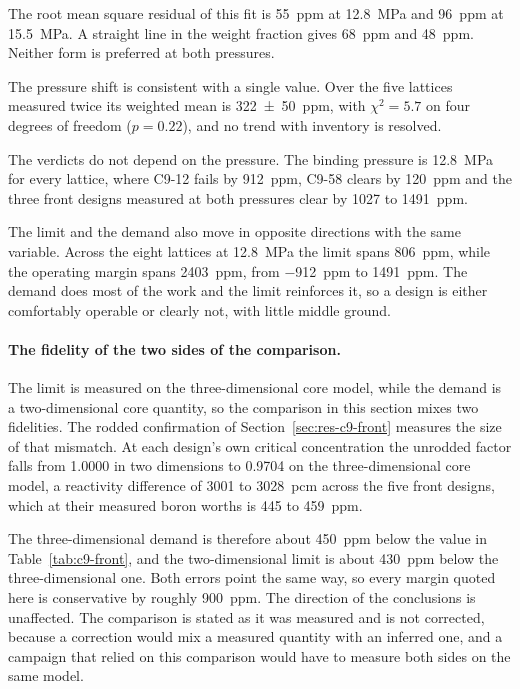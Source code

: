 The root mean square residual of this fit is \SI{55}{ppm} at
\SI{12.8}{MPa} and \SI{96}{ppm} at \SI{15.5}{MPa}. A straight line in
the weight fraction gives \SI{68}{ppm} and \SI{48}{ppm}. Neither form is
preferred at both pressures.

The pressure shift is consistent with a single value. Over the five
lattices measured twice its weighted mean is \SI{322(50)}{ppm}, with
$\chi^2 = 5.7$ on four degrees of freedom ($p = 0.22$), and no trend
with inventory is resolved.

The verdicts do not depend on the pressure. The binding pressure is
\SI{12.8}{MPa} for every lattice, where C9-12 fails by \SI{912}{ppm},
C9-58 clears by \SI{120}{ppm} and the three front designs measured at
both pressures clear by 1027 to \SI{1491}{ppm}.

The limit and the demand also move in opposite directions with the
same variable. Across the eight lattices at \SI{12.8}{MPa} the limit
spans \SI{806}{ppm}, while the operating margin spans \SI{2403}{ppm},
from \SI{-912}{ppm} to \SI{+1491}{ppm}. The demand does most of the work
and the limit reinforces it, so a design is either comfortably
operable or clearly not, with little middle ground.

\paragraph{The fidelity of the two sides of the comparison.}
The limit is measured on the three-dimensional core model, while the demand is a
two-dimensional core quantity, so the comparison in this section mixes two
fidelities. The rodded confirmation of Section~\ref{sec:res-c9-front}
measures the size of that mismatch. At each design's own critical
concentration the unrodded factor falls from 1.0000 in two dimensions to
0.9704 on the three-dimensional core model, a reactivity difference of 3001 to
\SI{3028}{pcm} across the five front designs, which at their measured boron
worths is 445 to \SI{459}{ppm}.

The three-dimensional demand is therefore about \SI{450}{ppm} below the value
in Table~\ref{tab:c9-front}, and the two-dimensional limit is about
\SI{430}{ppm} below the three-dimensional one. Both errors point the same
way, so every margin quoted here is conservative by roughly \SI{900}{ppm}.
The direction of the conclusions is unaffected. The comparison is stated as
it was measured and is not corrected, because a correction would mix a
measured quantity with an inferred one, and a campaign that relied on this
comparison would have to measure both sides on the same model.


